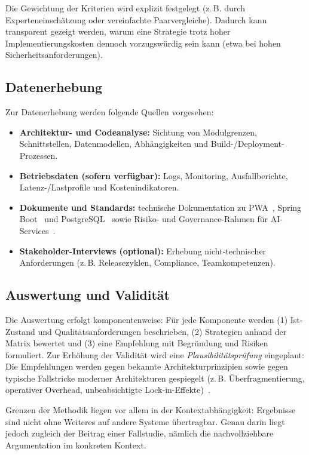 Die Gewichtung der Kriterien wird explizit festgelegt (z.\,B. durch Experteneinschätzung oder vereinfachte Paarvergleiche). Dadurch kann transparent gezeigt werden, warum eine Strategie trotz hoher Implementierungskosten dennoch vorzugswürdig sein kann (etwa bei hohen Sicherheitsanforderungen).

\subsection{Datenerhebung}

Zur Datenerhebung werden folgende Quellen vorgesehen:
\begin{itemize}
  \item \textbf{Architektur- und Codeanalyse:} Sichtung von Modulgrenzen, Schnittstellen, Datenmodellen, Abhängigkeiten und Build-/Deployment-Prozessen.
  \item \textbf{Betriebsdaten (sofern verfügbar):} Logs, Monitoring, Ausfallberichte, Latenz-/Lastprofile und Kostenindikatoren.
  \item \textbf{Dokumente und Standards:} technische Dokumentation zu PWA~\cite{mdn2024pwa}, Spring Boot~\cite{springboot2024docs} und PostgreSQL~\cite{postgresql2023docs} sowie Risiko- und Governance-Rahmen für AI-Services~\cite{nist2023airmf}.
  \item \textbf{Stakeholder-Interviews (optional):} Erhebung nicht-technischer Anforderungen (z.\,B. Releasezyklen, Compliance, Teamkompetenzen).
\end{itemize}

\subsection{Auswertung und Validität}

Die Auswertung erfolgt komponentenweise: Für jede Komponente werden (1) Ist-Zustand und Qualitätsanforderungen beschrieben, (2) Strategien anhand der Matrix bewertet und (3) 
eine Empfehlung mit Begründung und Risiken formuliert. Zur Erhöhung der Validität wird eine \emph{Plausibilitätsprüfung} eingeplant: Die Empfehlungen werden gegen 
bekannte Architekturprinzipien sowie gegen typische Fallstricke moderner Architekturen gespiegelt (z.\,B. Überfragmentierung, operativer Overhead, unbeabsichtigte 
Lock-in-Effekte)~\cite{richards2020fundamentals,ford2021hardparts}.

Grenzen der Methodik liegen vor allem in der Kontextabhängigkeit: Ergebnisse sind nicht ohne Weiteres auf andere Systeme übertragbar. Genau darin liegt jedoch zugleich 
der Beitrag einer Fallstudie, nämlich die nachvollziehbare Argumentation im konkreten Kontext.

